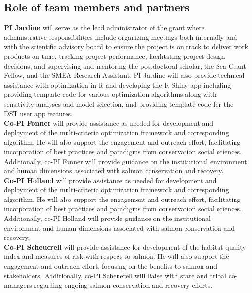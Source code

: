 \documentclass[12pt]{elsarticle}
\begin{document}
\subsection*{Role of team members and partners}
\textbf{PI Jardine} will serve as the lead administrator of the grant where administrative responsibilities include organizing meetings both internally and with the scientific advisory board to ensure the project is on track to deliver work products on time, tracking project performance, facilitating project design decisions, and supervising and mentoring the postdoctoral scholar, the Sea Grant Fellow, and the SMEA Research Assistant.  PI Jardine will also provide technical assistance with optimization in R and developing the R Shiny app including providing template code for various optimization algorithms along with sensitivity analyses and model selection, and providing template code for the DST user app features.\\

\textbf{Co-PI Fonner} will provide assistance as needed for development and deployment of the multi-criteria optimization framework and corresponding algorithm. He will also support the engagement and outreach effort, facilitating incorporation of best practices and paradigms from conservation social sciences. Additionally, co-PI Fonner will provide guidance on the institutional environment and human dimensions associated with salmon conservation and recovery.\\

\textbf{Co-PI Holland} will provide assistance as needed for development and deployment of the multi-criteria optimization framework and corresponding algorithm. He will also support the engagement and outreach effort, facilitating incorporation of best practices and paradigms from conservation social sciences. Additionally, co-PI Holland will provide guidance on the institutional environment and human dimensions associated with salmon conservation and recovery.\\

\textbf{Co-PI Scheuerell} will provide assistance for development of the habitat quality index and measures of risk with respect to salmon. He will also support the engagement and outreach effort, focusing on the benefits to salmon and stakeholders. Additionally, co-PI Scheuerell will liaise with state and tribal co-managers regarding ongoing salmon conservation and recovery efforts.\\
\end{document}
